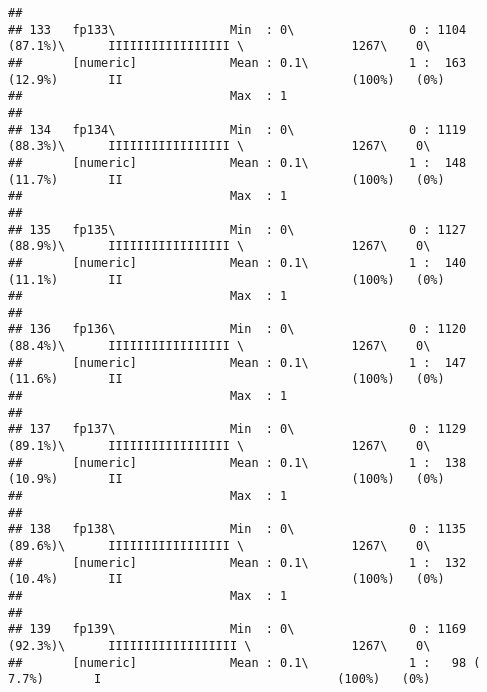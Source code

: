 \documentclass[]{article}
\begin{document}
\begin{verbatim}
## 
## 133   fp133\                Min  : 0\                0 : 1104 (87.1%)\      IIIIIIIIIIIIIIIII \               1267\    0\       
##       [numeric]             Mean : 0.1\              1 :  163 (12.9%)       II                                (100%)   (0%)     
##                             Max  : 1                                                                                            
## 
## 134   fp134\                Min  : 0\                0 : 1119 (88.3%)\      IIIIIIIIIIIIIIIII \               1267\    0\       
##       [numeric]             Mean : 0.1\              1 :  148 (11.7%)       II                                (100%)   (0%)     
##                             Max  : 1                                                                                            
## 
## 135   fp135\                Min  : 0\                0 : 1127 (88.9%)\      IIIIIIIIIIIIIIIII \               1267\    0\       
##       [numeric]             Mean : 0.1\              1 :  140 (11.1%)       II                                (100%)   (0%)     
##                             Max  : 1                                                                                            
## 
## 136   fp136\                Min  : 0\                0 : 1120 (88.4%)\      IIIIIIIIIIIIIIIII \               1267\    0\       
##       [numeric]             Mean : 0.1\              1 :  147 (11.6%)       II                                (100%)   (0%)     
##                             Max  : 1                                                                                            
## 
## 137   fp137\                Min  : 0\                0 : 1129 (89.1%)\      IIIIIIIIIIIIIIIII \               1267\    0\       
##       [numeric]             Mean : 0.1\              1 :  138 (10.9%)       II                                (100%)   (0%)     
##                             Max  : 1                                                                                            
## 
## 138   fp138\                Min  : 0\                0 : 1135 (89.6%)\      IIIIIIIIIIIIIIIII \               1267\    0\       
##       [numeric]             Mean : 0.1\              1 :  132 (10.4%)       II                                (100%)   (0%)     
##                             Max  : 1                                                                                            
## 
## 139   fp139\                Min  : 0\                0 : 1169 (92.3%)\      IIIIIIIIIIIIIIIIII \              1267\    0\       
##       [numeric]             Mean : 0.1\              1 :   98 ( 7.7%)       I                                 (100%)   (0%)     

\end{verbatim}
\end{document}
